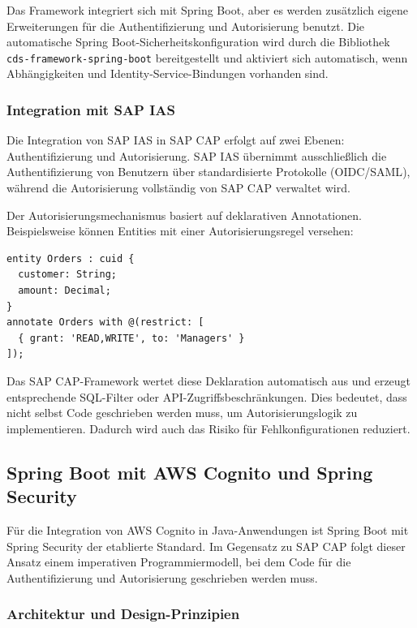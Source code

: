 Das Framework integriert sich mit Spring Boot, aber es werden zusätzlich eigene Erweiterungen für die Authentifizierung und Autorisierung benutzt. Die automatische Spring Boot-Sicherheitskonfiguration wird durch die Bibliothek \texttt{cds-framework-spring-boot} bereitgestellt und aktiviert sich automatisch, wenn Abhängigkeiten und Identity-Service-Bindungen vorhanden sind.

\subsubsection{Integration mit \ac{SAP IAS}}

Die Integration von \ac{SAP IAS} in \ac{SAP CAP} erfolgt auf zwei Ebenen: Authentifizierung und Autorisierung. \ac{SAP IAS} übernimmt ausschließlich die Authentifizierung von Benutzern über standardisierte Protokolle (\ac{OIDC}/\ac{SAML}), während die Autorisierung vollständig von \ac{SAP CAP} verwaltet wird.

Der Autorisierungsmechanismus basiert auf deklarativen Annotationen. Beispielsweise können Entities mit einer Autorisierungsregel versehen:

\begin{verbatim}
entity Orders : cuid {
  customer: String;
  amount: Decimal;
}
annotate Orders with @(restrict: [
  { grant: 'READ,WRITE', to: 'Managers' }
]);
\end{verbatim}

Das \ac{SAP CAP}-Framework wertet diese Deklaration automatisch aus und erzeugt entsprechende SQL-Filter oder API-Zugriffsbeschränkungen. Dies bedeutet, dass nicht selbst Code geschrieben werden muss, um Autorisierungslogik zu implementieren. Dadurch wird auch das Risiko für Fehlkonfigurationen reduziert.

\subsection{Spring Boot mit AWS Cognito und Spring Security}

Für die Integration von \ac{AWS} Cognito in Java-Anwendungen ist Spring Boot mit Spring Security der etablierte Standard. Im Gegensatz zu \ac{SAP CAP} folgt dieser Ansatz einem imperativen Programmiermodell, bei dem Code für die Authentifizierung und Autorisierung geschrieben werden muss.

\subsubsection{Architektur und Design-Prinzipien}

